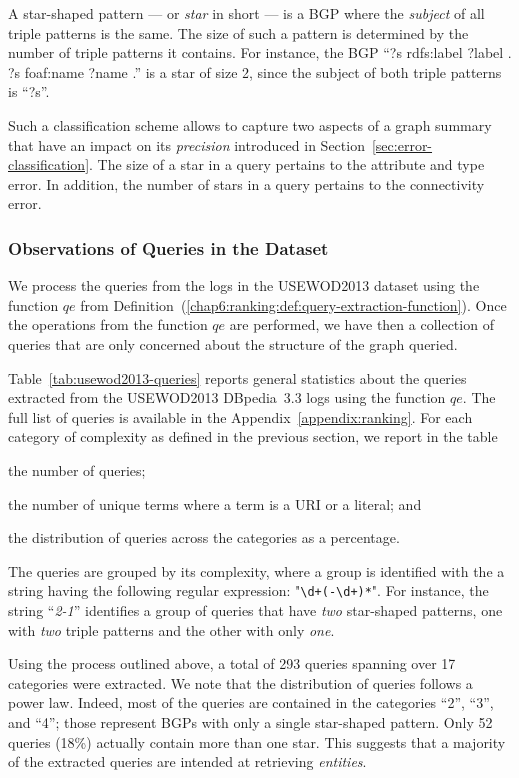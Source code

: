 A star-shaped pattern --- or \emph{star} in short --- is a BGP where the \emph{subject} of all triple patterns is the same. The size of such a pattern is determined by the number of triple patterns it contains. For instance, the BGP ``?s rdfs:label ?label . ?s foaf:name ?name .'' is a star of size 2, since the subject of both triple patterns is ``?s''.

Such a classification scheme allows to capture two aspects of a graph summary that have an impact on its \emph{precision} introduced in Section~\ref{sec:error-classification}. The size of a star in a query pertains to the attribute and type error. In addition, the number of stars in a query pertains to the \gls{connectivity} error.

\subsubsection{Observations of Queries in the Dataset}

We process the queries from the logs in the USEWOD2013 dataset using the function $qe$ from Definition~(\ref{chap6:ranking:def:query-extraction-function}).
Once the operations from the function $qe$ are performed, we have then a collection of queries that are only concerned about the structure of the graph queried.

Table~\ref{tab:usewod2013-queries} reports general statistics about the queries extracted from the USEWOD2013 DBpedia~3.3 logs using the function $qe$. The full list of queries is available in the Appendix~\ref{appendix:ranking}. For each category of complexity as defined in the previous section, we report in the table
\begin{inparaenum}[(a)]
\item the number of queries;
\item the number of unique terms where a term is a URI or a literal; and
\item the distribution of queries across the categories as a percentage.
\end{inparaenum}

The queries are grouped by its complexity, where a group is identified with the a string having the following regular expression: "\verb/\d+(-\d+)*/". For instance, the string ``\emph{2-1}'' identifies a group of queries that have \textit{two} star-shaped patterns, one with \textit{two} triple patterns and the other with only \textit{one}.

Using the process outlined above, a total of 293 queries spanning over 17 categories were extracted. We note that the distribution of queries follows a power law. Indeed, most of the queries are contained in the categories ``2'', ``3'', and ``4''; those represent BGPs with only a single star-shaped pattern. Only 52 queries (18\%) actually contain more than one star. This suggests that a majority of the extracted queries are intended at retrieving \emph{entities}.

